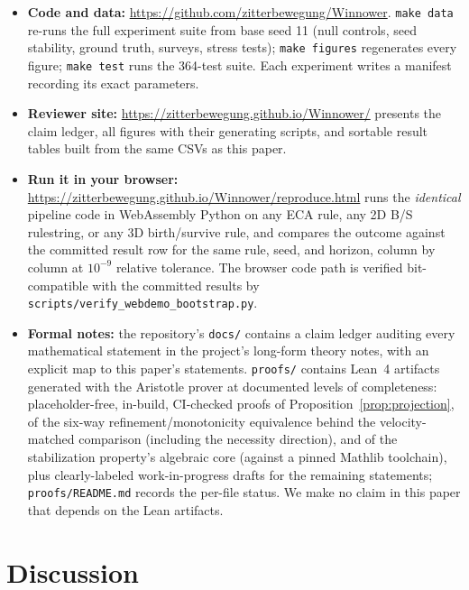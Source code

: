 \documentclass[letterpaper]{article}
\begin{document}
\begin{itemize}
\item \textbf{Code and data:}
  \url{https://github.com/zitterbewegung/Winnower}. \texttt{make data}
  re-runs the full experiment suite from base seed 11 (null controls,
  seed stability, ground truth, surveys, stress tests); \texttt{make
  figures} regenerates every figure; \texttt{make test} runs the
  364-test suite. Each experiment writes a manifest recording its exact
  parameters.
\item \textbf{Reviewer site:}
  \url{https://zitterbewegung.github.io/Winnower/} presents the claim
  ledger, all figures with their generating scripts, and sortable
  result tables built from the same CSVs as this paper.
\item \textbf{Run it in your browser:}
  \url{https://zitterbewegung.github.io/Winnower/reproduce.html} runs
  the \emph{identical} pipeline code in WebAssembly Python on any ECA
  rule, any 2D B/S rulestring, or any 3D birth/survive rule, and
  compares the outcome against the committed result row for the same
  rule, seed, and horizon, column by column at $10^{-9}$ relative
  tolerance. The browser code path is verified bit-compatible with the
  committed results by \texttt{scripts/verify\_webdemo\_bootstrap.py}.
\item \textbf{Formal notes:} the repository's \texttt{docs/} contains a
  claim ledger auditing every mathematical statement in the project's
  long-form theory notes, with an explicit map to this paper's
  statements. \texttt{proofs/} contains Lean~4 artifacts generated with
  the Aristotle prover at documented levels of completeness:
  placeholder-free, in-build, CI-checked proofs of
  Proposition~\ref{prop:projection}, of the six-way
  refinement/monotonicity equivalence behind the velocity-matched
  comparison (including the necessity direction), and of the
  stabilization property's algebraic core (against a pinned Mathlib
  toolchain), plus clearly-labeled work-in-progress drafts for the
  remaining statements;
  \texttt{proofs/README.md} records the per-file status. We make no
  claim in this paper that depends on the Lean artifacts.
\end{itemize}

\section{Discussion}
\end{document}
